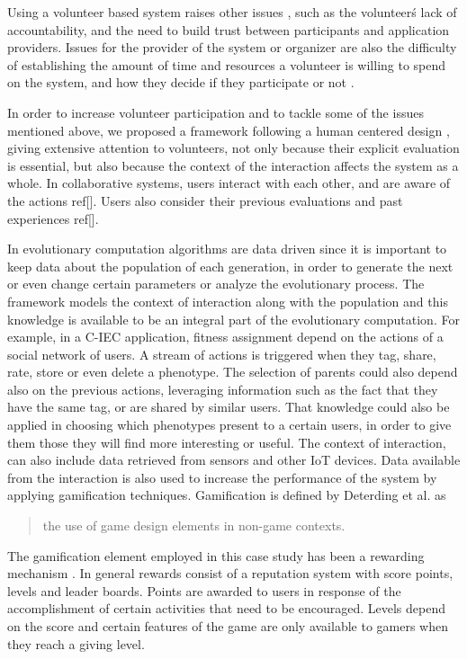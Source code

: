 Using a volunteer based system raises other issues \cite{sarmenta2001volunteer,web:BOINC}, 
such as the volunteer\'s lack of accountability,
and the need to build trust between participants and application
providers. Issues for the provider of the system or organizer  are also the difficulty of establishing 
the amount of time and resources
a volunteer is willing to spend on the system, and how they decide if they
participate or not \cite{JJ:2016}. 

In order to increase volunteer participation and to tackle some of the issues mentioned above,  
we proposed a framework following a human centered design \cite{greenhouse2012human},
giving extensive attention to volunteers, not only because their
explicit evaluation is essential, but also because the context of the 
interaction affects the system as a whole. In collaborative systems, users interact 
with each other, and are aware of the actions ref[]. Users also consider their previous evaluations
and past experiences ref[].

In evolutionary computation algorithms are data driven since it is important to keep data about the 
population of each generation, in order to generate the next or even change certain parameters
or analyze the evolutionary process. 
The framework models the context of interaction along with the population and
this knowledge is available to be an integral part of the evolutionary computation.
For example, in a C-IEC application, fitness assignment depend on the
actions of a social network of users. 
A stream of actions is triggered when they tag, share, rate, store or even delete a phenotype. 
The selection of parents could also depend also on the previous actions, leveraging information 
such as the fact that they have the same tag, or are shared by
similar users. That knowledge could also be applied in choosing which phenotypes present to a certain
users, in order to give them those they will find more interesting or useful. 
The context of interaction, can also include data retrieved from sensors and other IoT devices.
Data available from the interaction is also used to increase the performance of the system by applying 
gamification techniques. Gamification is defined by Deterding et al. \cite{deterding2011game} as
\begin{quote}
  the use of game design elements in non-game contexts.
\end{quote}  
The gamification element employed in this case study has been a rewarding mechanism  
\cite{dubois2013understanding}. In general rewards  consist of a reputation system with score points, 
levels and leader boards. Points are awarded to users in response of 
the accomplishment of certain activities that need to be encouraged. Levels depend
on the score and certain features of the game are only available to gamers when 
they reach a giving level. %


